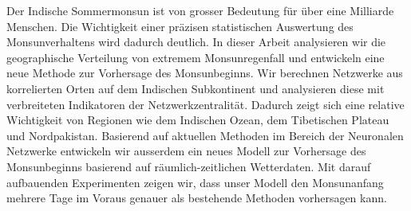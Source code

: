 \begin{zusammenfassung}
Der Indische Sommermonsun ist von grosser Bedeutung für über eine Milliarde Menschen. Die Wichtigkeit einer präzisen statistischen Auswertung des Monsunverhaltens wird dadurch deutlich. In dieser Arbeit analysieren wir die geographische Verteilung von extremem Monsunregenfall und entwickeln eine neue Methode zur Vorhersage des Monsunbeginns. Wir berechnen Netzwerke aus korrelierten Orten auf dem Indischen Subkontinent und analysieren diese mit verbreiteten Indikatoren der Netzwerkzentralität. Dadurch zeigt sich eine relative Wichtigkeit von Regionen wie dem Indischen Ozean, dem Tibetischen Plateau und Nordpakistan. Basierend auf aktuellen Methoden im Bereich der Neuronalen Netzwerke entwickeln wir ausserdem ein neues Modell zur Vorhersage des Monsunbeginns basierend auf räumlich-zeitlichen Wetterdaten. Mit darauf aufbauenden Experimenten zeigen wir, dass unser Modell den Monsunanfang mehrere Tage im Voraus genauer als bestehende Methoden vorhersagen kann.
\end{zusammenfassung}
